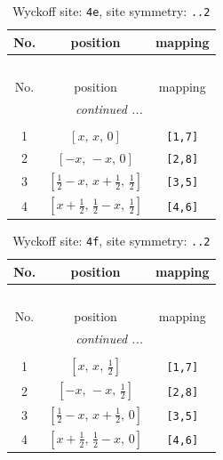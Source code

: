 \documentclass[fleqn,8pt]{jsarticle}
\begin{document}
\renewcommand{\arraystretch}{1.2}
\begin{longtable}{ccc}
\caption{Wyckoff site: {\tt 4e}, site symmetry: {\tt ..2}}
 \\
 \hline \hline
No. & position & mapping \\ \hline \endfirsthead

\multicolumn{2}{l}{\tablename\ \thetable{}} \\
 \hline \hline
No. & position & mapping \\ \hline \endhead

 \hline \hline
\multicolumn{2}{r}{\footnotesize\it continued ...} \\ \endfoot

 \hline \hline
\multicolumn{2}{r}{} \\ \endlastfoot

1 & $\left[ x,\, x,\, 0 \right]$ & {\tt [1,7]} \\ \hline
2 & $\left[ - x,\, - x,\, 0 \right]$ & {\tt [2,8]} \\ \hline
3 & $\left[ \frac{1}{2} - x,\, x + \frac{1}{2},\, \frac{1}{2} \right]$ & {\tt [3,5]} \\ \hline
4 & $\left[ x + \frac{1}{2},\, \frac{1}{2} - x,\, \frac{1}{2} \right]$ & {\tt [4,6]} \\
\end{longtable}
\renewcommand{\arraystretch}{1.2}
\begin{longtable}{ccc}
\caption{Wyckoff site: {\tt 4f}, site symmetry: {\tt ..2}}
 \\
 \hline \hline
No. & position & mapping \\ \hline \endfirsthead

\multicolumn{2}{l}{\tablename\ \thetable{}} \\
 \hline \hline
No. & position & mapping \\ \hline \endhead

 \hline \hline
\multicolumn{2}{r}{\footnotesize\it continued ...} \\ \endfoot

 \hline \hline
\multicolumn{2}{r}{} \\ \endlastfoot

1 & $\left[ x,\, x,\, \frac{1}{2} \right]$ & {\tt [1,7]} \\ \hline
2 & $\left[ - x,\, - x,\, \frac{1}{2} \right]$ & {\tt [2,8]} \\ \hline
3 & $\left[ \frac{1}{2} - x,\, x + \frac{1}{2},\, 0 \right]$ & {\tt [3,5]} \\ \hline
4 & $\left[ x + \frac{1}{2},\, \frac{1}{2} - x,\, 0 \right]$ & {\tt [4,6]} \\
\end{longtable}
\end{document}
